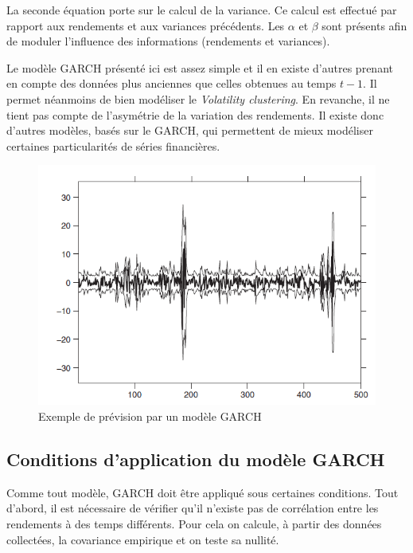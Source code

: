 			La seconde équation porte sur le calcul de la variance. Ce calcul est effectué par rapport aux rendements et aux variances précédents. Les $\alpha$ et $\beta$ sont présents afin de moduler l'influence des informations (rendements et variances).

			Le modèle GARCH présenté ici est assez simple et il en existe d'autres prenant en compte des données plus anciennes que celles obtenues au temps $t-1$. Il permet néanmoins de bien modéliser le \textit{Volatility clustering}. En revanche, il ne tient pas compte de l'asymétrie de la variation des rendements. Il existe donc d'autres modèles, basés sur le GARCH, qui permettent de mieux modéliser certaines particularités de séries financières.

			\begin{figure}[h]
				\center
				\includegraphics{AjustementParGarch.png}
				\caption{Exemple de prévision par un modèle GARCH}
				\label{ajustement_garch}
			\end{figure}


		\subsection{Conditions d'application du modèle GARCH}
		\label{subsubsection:condition-garch}
			Comme tout modèle, GARCH doit être appliqué sous certaines conditions. Tout d'abord, il est nécessaire de vérifier qu'il n'existe pas de corrélation entre les rendements à des temps différents.
			Pour cela on calcule, à partir des données collectées, la covariance empirique et on teste sa nullité. 

